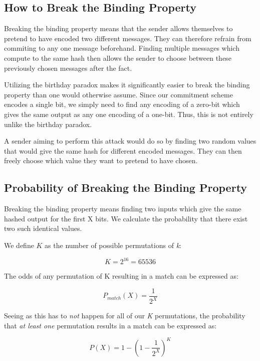 \documentclass[a4paper,11pt]{article}
\begin{document}
\subsection{How to Break the Binding Property}
Breaking the binding property means that the sender allows themselves to pretend to have encoded two different messages. They can therefore refrain from commiting to any one message beforehand. Finding multiple messages which compute to the same hash then allows the sender to choose between these previously chosen messages after the fact.

Utilizing the birthday paradox makes it significantly easier to break the binding property than one would otherwise assume. Since our commitment scheme encodes a single bit, we simply need to find any encoding of a zero-bit which gives the same output as any one encoding of a one-bit. Thus, this is not entirely unlike the birthday paradox.

A sender aiming to perform this attack would do so by finding two random values that would give the same hash for different encoded messages. They can then freely choose which value they want to pretend to have chosen.

\subsection{Probability of Breaking the Binding Property}
Breaking the binding property means finding two inputs which give the same hashed output for the first X bits. We calculate the probability that there exist two such identical values.

We define $ K $ as the number of possible permutations of \textit{k}:

\[ K = 2^{16} = 65536 \]

The odds of any permutation of K resulting in a match can be expressed as:

\[ P_{match}(X) = \frac{1}{2^{X}} \]

Seeing as this has to \textit{not} happen for all of our \textit{K} permutations, the probability that \textit{at least one} permutation results in a match can be expressed as:

\[ P(X) = 1 - (1 - \frac{1}{2^{X}})^{K} \]
\end{document}
